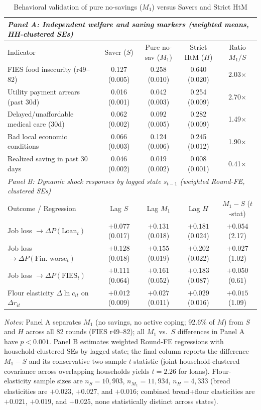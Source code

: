 \documentclass[11pt]{article}
\begin{document}
\begin{table}[tbp]
\centering
\caption{Behavioral validation of pure no-savings ($M_1$) versus Savers and Strict HtM}
\label{tab:m1val}
\scriptsize
\setlength{\tabcolsep}{3.6pt}
\begin{tabular}{lcccc}
\toprule
\multicolumn{5}{l}{\textit{Panel A: Independent welfare and saving markers (weighted means, HH-clustered SEs)}} \\
\midrule
Indicator & Saver ($S$) & Pure no-sav ($M_1$) & Strict HtM ($H$) & Ratio $M_1 / S$ \\
\midrule
FIES food insecurity (r49--82) & 0.127 (0.005) & 0.258 (0.010) & 0.640 (0.020) & 2.03$\times$ \\
Utility payment arrears (past 30d) & 0.016 (0.001) & 0.042 (0.003) & 0.254 (0.009) & 2.70$\times$ \\
Delayed/unaffordable medical care (30d) & 0.062 (0.002) & 0.092 (0.005) & 0.282 (0.009) & 1.49$\times$ \\
Bad local economic conditions & 0.066 (0.003) & 0.124 (0.006) & 0.245 (0.012) & 1.90$\times$ \\
Realized saving in past 30 days & 0.046 (0.002) & 0.019 (0.002) & 0.008 (0.001) & 0.41$\times$ \\
\midrule
\multicolumn{5}{l}{\textit{Panel B: Dynamic shock responses by lagged state $s_{t-1}$ (weighted Round-FE, clustered SEs)}} \\
\midrule
Outcome / Regression & Lag $S$ & Lag $M_1$ & Lag $H$ & $M_1 - S$ ($t$-stat) \\
\midrule
Job loss $\to \Delta P(\text{Loan}_t)$ & $+0.077$ (0.017) & $+0.131$ (0.018) & $+0.181$ (0.024) & $+0.054$ (2.17) \\
Job loss $\to \Delta P(\text{Fin.\ worse}_t)$ & $+0.128$ (0.018) & $+0.155$ (0.019) & $+0.202$ (0.022) & $+0.027$ (1.02) \\
Job loss $\to \Delta P(\text{FIES}_t)$ & $+0.111$ (0.064) & $+0.161$ (0.052) & $+0.183$ (0.087) & $+0.050$ (0.61) \\
Flour elasticity $\Delta \ln c_{it}$ on $\Delta r_{it}$ & $+0.012$ (0.009) & $+0.027$ (0.011) & $+0.029$ (0.016) & $+0.015$ (1.09) \\
\bottomrule
\end{tabular}
\begin{flushleft}
\footnotesize\textit{Notes:} Panel A separates $M_1$ (no savings, no active coping; 92.6\% of $M$) from $S$ and $H$ across all 82 rounds (FIES r49--82); all $M_1$ vs.\ $S$ differences in Panel A have $p < 0.001$. Panel B estimates weighted Round-FE regressions with household-clustered SEs by lagged state; the final column reports the difference $M_1 - S$ and its conservative two-sample $t$-statistic (joint household-clustered covariance across overlapping households yields $t = 2.26$ for loans). Flour-elasticity sample sizes are $n_S = 10{,}903$, $n_{M_1} = 11{,}934$, $n_H = 4{,}333$ (bread elasticities are $+0.023$, $+0.027$, and $+0.016$; combined bread+flour elasticities are $+0.021$, $+0.019$, and $+0.025$, none statistically distinct across states).
\end{flushleft}
\end{table}
\end{document}

